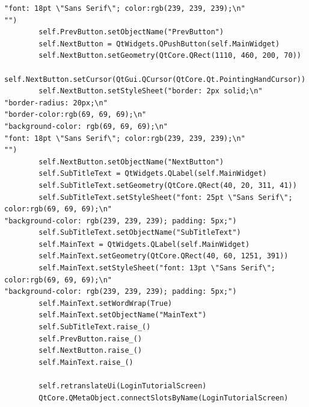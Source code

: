 \documentclass[12pt]{article}
\begin{document}
\begin{lstlisting}
"font: 18pt \"Sans Serif\"; color:rgb(239, 239, 239);\n"
"")
        self.PrevButton.setObjectName("PrevButton")
        self.NextButton = QtWidgets.QPushButton(self.MainWidget)
        self.NextButton.setGeometry(QtCore.QRect(1110, 460, 200, 70))
        self.NextButton.setCursor(QtGui.QCursor(QtCore.Qt.PointingHandCursor))
        self.NextButton.setStyleSheet("border: 2px solid;\n"
"border-radius: 20px;\n"
"border-color:rgb(69, 69, 69);\n"
"background-color: rgb(69, 69, 69);\n"
"font: 18pt \"Sans Serif\"; color:rgb(239, 239, 239);\n"
"")
        self.NextButton.setObjectName("NextButton")
        self.SubTitleText = QtWidgets.QLabel(self.MainWidget)
        self.SubTitleText.setGeometry(QtCore.QRect(40, 20, 311, 41))
        self.SubTitleText.setStyleSheet("font: 25pt \"Sans Serif\"; color:rgb(69, 69, 69);\n"
"background-color: rgb(239, 239, 239); padding: 5px;")
        self.SubTitleText.setObjectName("SubTitleText")
        self.MainText = QtWidgets.QLabel(self.MainWidget)
        self.MainText.setGeometry(QtCore.QRect(40, 60, 1251, 391))
        self.MainText.setStyleSheet("font: 13pt \"Sans Serif\"; color:rgb(69, 69, 69);\n"
"background-color: rgb(239, 239, 239); padding: 5px;")
        self.MainText.setWordWrap(True)
        self.MainText.setObjectName("MainText")
        self.SubTitleText.raise_()
        self.PrevButton.raise_()
        self.NextButton.raise_()
        self.MainText.raise_()

        self.retranslateUi(LoginTutorialScreen)
        QtCore.QMetaObject.connectSlotsByName(LoginTutorialScreen)


\end{lstlisting}
\end{document}
